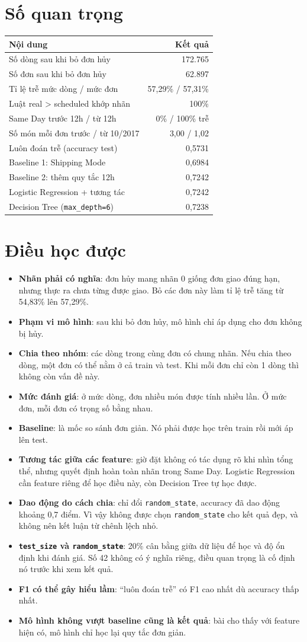 \documentclass[11pt,a4paper]{article}
\newcommand{\col}[1]{\textsf{#1}}
\newcommand{\term}[2]{\item \textbf{#1}: #2}
\begin{document}
\section{Số quan trọng}
\begin{table}[H]\centering
\begin{tabularx}{\linewidth}{>{\raggedright\arraybackslash}X r}
\toprule
\textbf{Nội dung} & \textbf{Kết quả} \\
\midrule
Số dòng sau khi bỏ đơn hủy & 172.765 \\
Số đơn sau khi bỏ đơn hủy & 62.897 \\
Tỉ lệ trễ mức dòng / mức đơn & 57,29\% / 57,31\% \\
Luật \col{real > scheduled} khớp nhãn & 100\% \\
Same Day trước 12h / từ 12h & 0\% / 100\% trễ \\
Số món mỗi đơn trước / từ 10/2017 & 3,00 / 1,02 \\
Luôn đoán trễ (accuracy test) & 0,5731 \\
Baseline 1: Shipping Mode & 0,6984 \\
Baseline 2: thêm quy tắc 12h & 0,7242 \\
Logistic Regression + tương tác & 0,7242 \\
Decision Tree (\texttt{max\_depth=6}) & 0,7238 \\
\bottomrule
\end{tabularx}
\end{table}

\section{Điều học được}
\begin{itemize}
  \term{Nhãn phải có nghĩa}{đơn hủy mang nhãn 0 giống đơn giao đúng hạn, nhưng thực ra chưa từng được giao. Bỏ các đơn này làm tỉ lệ trễ tăng từ 54,83\% lên 57,29\%.}
  \term{Phạm vi mô hình}{sau khi bỏ đơn hủy, mô hình chỉ áp dụng cho đơn không bị hủy.}
  \term{Chia theo nhóm}{các dòng trong cùng đơn có chung nhãn. Nếu chia theo dòng, một đơn có thể nằm ở cả train và test. Khi mỗi đơn chỉ còn 1 dòng thì không còn vấn đề này.}
  \term{Mức đánh giá}{ở mức dòng, đơn nhiều món được tính nhiều lần. Ở mức đơn, mỗi đơn có trọng số bằng nhau.}
  \term{Baseline}{là mốc so sánh đơn giản. Nó phải được học trên train rồi mới áp lên test.}
  \term{Tương tác giữa các feature}{giờ đặt không có tác dụng rõ khi nhìn tổng thể, nhưng quyết định hoàn toàn nhãn trong Same Day. Logistic Regression cần feature riêng để học điều này, còn Decision Tree tự học được.}
  \term{Dao động do cách chia}{chỉ đổi \texttt{random\_state}, accuracy đã dao động khoảng 0,7 điểm. Vì vậy không được chọn \texttt{random\_state} cho kết quả đẹp, và không nên kết luận từ chênh lệch nhỏ.}
  \term{\texttt{test\_size} và \texttt{random\_state}}{20\% cân bằng giữa dữ liệu để học và độ ổn định khi đánh giá. Số 42 không có ý nghĩa riêng, điều quan trọng là cố định nó trước khi xem kết quả.}
  \term{F1 có thể gây hiểu lầm}{``luôn đoán trễ'' có F1 cao nhất dù accuracy thấp nhất.}
  \term{Mô hình không vượt baseline cũng là kết quả}{bài cho thấy với feature hiện có, mô hình chỉ học lại quy tắc đơn giản.}
\end{itemize}
\end{document}
